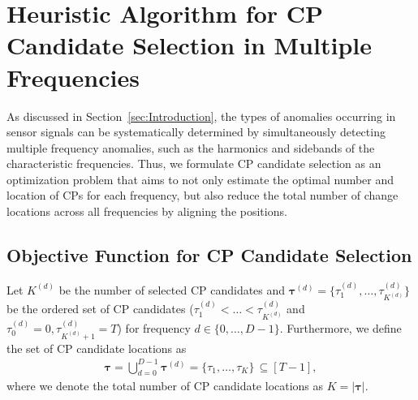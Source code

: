 \section{Heuristic Algorithm for CP Candidate Selection in Multiple Frequencies}
\label{sec:CpSelection}
%
As discussed in Section~\ref{sec:Introduction}, the types of anomalies occurring in sensor signals can be systematically determined by simultaneously detecting multiple frequency anomalies, such as the harmonics and sidebands of the characteristic frequencies.
%
Thus, we formulate CP candidate selection as an optimization problem that aims to not only estimate the optimal number and location of CPs for each frequency, but also reduce the total number of change locations across all frequencies by aligning the positions.

\subsection{Objective Function for CP Candidate Selection}
%
Let $K^{(d)}$ be the number of selected CP candidates and $\bm{\tau}^{(d)} = \{{\tau}_1^{(d)}, \dots, {\tau}_{K^{(d)}}^{(d)}\}$ be the ordered set of CP candidates (${\tau}_1^{(d)} < \dots < {\tau}_{K^{(d)}}^{(d)}$ and ${\tau}_0^{(d)} = 0, {\tau}_{K^{(d)}+1}^{(d)} = T$) for frequency $d \in \{0, \ldots, D-1\}$.
%
Furthermore, we define the set of CP candidate locations as
\begin{align}
\bm{\tau} = \bigcup_{d = 0}^{D-1} \bm{\tau}^{(d)} = \{{\tau}_1, \dots, {\tau}_{K}\} \, \subseteq [T-1], \label{changetimepoint} %
\end{align}
where we denote the total number of CP candidate locations as $K = |\bm{\tau}|$.

